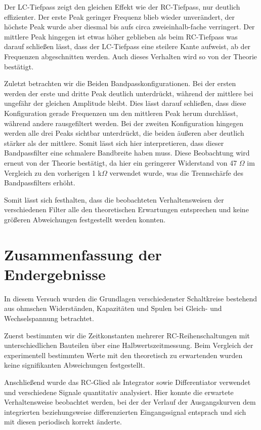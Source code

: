 \documentclass{article}
\begin{document}
Der LC-Tiefpass zeigt den gleichen Effekt wie der RC-Tiefpass, nur deutlich effizienter. Der erste Peak geringer Frequenz blieb wieder unverändert, der höchste Peak wurde aber diesmal bis aufs circa zweieinhalb-fache verringert. Der mittlere Peak hingegen ist etwas höher geblieben als beim RC-Tiefpass was darauf schließen lässt, dass der LC-Tiefpass eine steilere Kante aufweist, ab der Frequenzen abgeschnitten werden. Auch dieses Verhalten wird so von der Theorie bestätigt.

Zuletzt betrachten wir die Beiden Bandpasskonfigurationen. Bei der ersten werden der erste und dritte Peak deutlich unterdrückt, während der mittlere bei ungefähr der gleichen Amplitude bleibt. Dies lässt darauf schließen, dass diese Konfiguration gerade Frequenzen um den mittleren Peak herum durchlässt, während andere rausgefiltert werden. Bei der zweiten Konfiguration hingegen werden alle drei Peaks sichtbar unterdrückt, die beiden äußeren aber deutlich stärker als der mittlere. Somit lässt sich hier interpretieren, dass dieser Bandpassfilter eine schmalere Bandbreite haben muss. Diese Beobachtung wird erneut von der Theorie bestätigt, da hier ein geringerer Widerstand von 47 $\Omega$ im Vergleich zu den vorherigen 1 k$\Omega$ verwendet wurde, was die Trennschärfe des Bandpassfilters erhöht. 

Somit lässt sich festhalten, dass die beobachteten Verhaltensweisen der verschiedenen Filter alle den theoretischen Erwartungen entsprechen und keine größeren Abweichungen festgestellt werden konnten.



\clearpage
\newpage
\section{Zusammenfassung der Endergebnisse}

In diesem Versuch wurden die Grundlagen verschiedenster Schaltkreise bestehend aus ohmschen Widerständen, Kapazitäten und Spulen bei Gleich- und Wechselspannung betrachtet. 

Zuerst bestimmten wir die Zeitkonstanten mehrerer RC-Reihenschaltungen mit unterschiedlichen Bauteilen über eine Halbwertszeitmessung. Beim Vergleich der experimentell bestimmten Werte mit den theoretisch zu erwartenden wurden keine signifikanten Abweichungen festgestellt.

Anschließend wurde das RC-Glied als Integrator sowie Differentiator verwendet und verschiedene Signale quantitativ analysiert. Hier konnte die erwartete Verhaltensweise beobachtet werden, bei der der Verlauf der Ausgangskurven dem integrierten beziehungsweise differenzierten Eingangssignal entsprach und sich mit diesen periodisch korrekt änderte.
\end{document}

